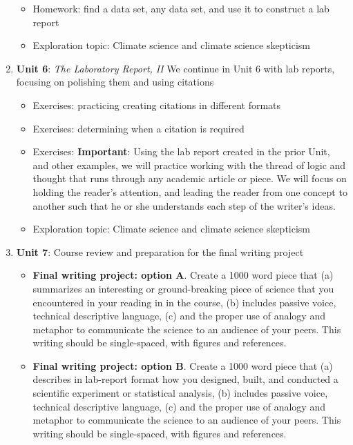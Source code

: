 \documentclass[10pt]{article}
\begin{document}
\begin{enumerate}
\begin{itemize}
\item Homework: find a data set, any data set, and use it to construct a lab report
\item Exploration topic: Climate science and climate science skepticism
\end{itemize}
\item \textbf{Unit 6}: \textit{The Laboratory Report, II} We continue in Unit 6 with lab reports, focusing on polishing them and using citations
\begin{itemize}
\item Exercises: practicing creating citations in different formats
\item Exercises: determining when a citation is required
\item Exercises: \textbf{Important}: Using the lab report created in the prior Unit, and other examples, we will practice working with the thread of logic and thought that runs through any academic article or piece.  We will focus on holding the reader's attention, and leading the reader from one concept to another such that he or she understands each step of the writer's ideas.
\item Exploration topic: Climate science and climate science skepticism
\end{itemize}
\item \textbf{Unit 7}: Course review and preparation for the final writing project
\begin{itemize}
\item \textbf{Final writing project: option A}.  Create a 1000 word piece that (a) summarizes an interesting or ground-breaking piece of science that you encountered in your reading in in the course, (b) includes passive voice, technical descriptive language, (c) and the proper use of analogy and metaphor to communicate the science to an audience of your peers.  This writing should be single-spaced, with figures and references.
\item \textbf{Final writing project: option B}.  Create a 1000 word piece that (a) describes in lab-report format how you designed, built, and conducted a scientific experiment or statistical analysis, (b) includes passive voice, technical descriptive language, (c) and the proper use of analogy and metaphor to communicate the science to an audience of your peers.  This writing should be single-spaced, with figures and references.
\end{itemize}
\end{enumerate}
\end{document}
